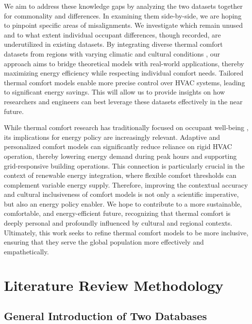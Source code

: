 \documentclass[final,3p,times,12pt]{elsarticle}
\begin{document}
We aim to address these knowledge gaps by analyzing the two datasets together for commonality and differences. In examining them side-by-side, we are hoping to pinpoint specific areas of misalignments. We investigate which remain unused and to what extent individual occupant differences, though recorded, are underutilized in existing datasets. By integrating diverse thermal comfort datasets from regions with varying climatic and cultural conditions \cite{aljawabraInfluenceHotArid2010,aljawabraThermalComfortUrban2018}, our approach aims to bridge theoretical models with real-world applications, thereby maximizing energy efficiency while respecting individual comfort needs. Tailored thermal comfort models enable more precise control over HVAC systems, leading to significant energy savings. This will allow us to provide insights on how researchers and engineers can best leverage these datasets effectively in the near future.

While thermal comfort research has traditionally focused on occupant well-being \cite{singhProgressThermalComfort2019}, its implications for energy policy are increasingly relevant. Adaptive and personalized comfort models can significantly reduce reliance on rigid HVAC operation, thereby lowering energy demand during peak hours and supporting grid-responsive building operations. This connection is particularly crucial in the context of renewable energy integration, where flexible comfort thresholds can complement variable energy supply. Therefore, improving the contextual accuracy and cultural inclusiveness of comfort models is not only a scientific imperative, but also an energy policy enabler. We hope to contribute to a more sustainable, comfortable, and energy-efficient future, recognizing that thermal comfort is deeply personal and profoundly influenced by cultural and regional contexts. Ultimately, this work seeks to refine thermal comfort models to be more inclusive, ensuring that they serve the global population more effectively and empathetically.  

\section{Literature Review Methodology}
\label{sec1}

\subsection{General Introduction of Two Databases}
\label{subsec1}
\end{document}
